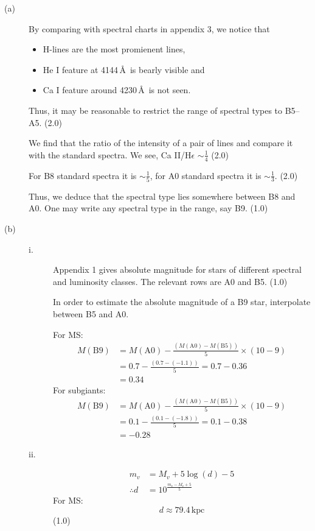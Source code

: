 \begin{description}
\item[(a)] By comparing with spectral charts in appendix 3, we notice that
  \begin{itemize}
  \item H-lines are the most promienent %
    lines,
  \item He I feature at 4144\,\AA\ is bearly %
    visible and
  \item Ca I feature around 4230\,\AA\ is not seen.
  \end{itemize}
  Thus, it may be reasonable to restrict the range of spectral types to
  B5--A5. \hfill(2.0)

  We find that the ratio of the intensity of a pair of lines and compare it
  with the standard spectra. We see,
  Ca II/H$\epsilon$ $\sim \frac{1}{4}$ \hfill(2.0)

  For B8 standard spectra it is $\sim \frac{1}{5}$, for A0 standard spectra it
  is $\sim \frac{1}{3}$. \hfill(2.0)

  Thus, we deduce that the spectral type lies somewhere between B8 and A0.
  One may write any spectral type in the range, say B9. \hfill(1.0)
\item[(b)] \mbox{}
  \begin{description}
  \item[i.] Appendix 1 gives absolute magnitude for stars of different
    spectral and luminosity classes. The relevant rows are A0 and B5.
    \hfill(1.0)

    In order to estimate the absolute magnitude of a B9 star, interpolate
    between B5 and A0.

    For MS:
    \begin{align*}
      M(\mathrm{B9}) &= M(\mathrm{A0})
        - \frac{(M(\mathrm{A0}) - M(\mathrm{B5}))}{5}\times(10-9)\\
        &= 0.7 - \frac{(0.7 - (-1.1))}{5} = 0.7 - 0.36\\
        &= 0.34 \tag*{(2.0)}
    \end{align*}
    For subgiants:
    \begin{align*}
      M(\mathrm{B9}) &= M(\mathrm{A0})
        - \frac{(M(\mathrm{A0}) - M(\mathrm{B5}))}{5}\times(10-9)\\
        &= 0.1 - \frac{(0.1 - (-1.8))}{5} = 0.1 - 0.38\\
        &= -0.28 \tag*{(2.0)}
    \end{align*}
  \item[ii.]
    \begin{align*}
      m_v &= M_v + 5\log(d) - 5\\
      \therefore d &= 10^{\frac{m_v - M_v + 5}{5}} \tag*{(1.0)}
    \end{align*}
    For MS:
    \[
      d \approx 79.4\,\mathrm{kpc}
    \]
    \hfill(1.0)


\end{description}
\end{description}
